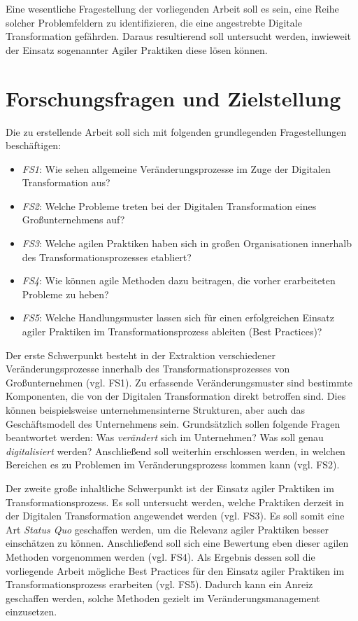 Eine wesentliche Fragestellung der vorliegenden Arbeit soll es sein, eine Reihe solcher Problemfeldern zu identifizieren, die eine angestrebte Digitale Transformation gefährden. Daraus resultierend soll untersucht werden, inwieweit der Einsatz sogenannter Agiler Praktiken diese lösen können.

\section{Forschungsfragen und Zielstellung}

Die zu erstellende Arbeit soll sich mit folgenden grundlegenden
Fragestellungen beschäftigen:

\begin{itemize}[noitemsep, topsep=0pt]
	\item \textit{FS1}: Wie sehen allgemeine Veränderungsprozesse im Zuge der Digitalen Transformation aus?
	\item \textit{FS2}: Welche Probleme treten bei der Digitalen Transformation eines Großunternehmens auf?
	\item \textit{FS3}: Welche agilen Praktiken haben sich in großen Organisationen innerhalb des Transformationsprozesses etabliert?
	\item \textit{FS4}: Wie können agile Methoden dazu beitragen, die vorher erarbeiteten Probleme zu heben?
	\item \textit{FS5}: Welche Handlungsmuster lassen sich für einen erfolgreichen Einsatz agiler Praktiken im Transformationsprozess ableiten (Best Practices)?
\end{itemize}
Der erste Schwerpunkt besteht in der Extraktion verschiedener Veränderungsprozesse innerhalb des Transformationsprozesses von Großunternehmen (vgl. FS1). Zu erfassende Veränderungsmuster sind bestimmte Komponenten, die von der Digitalen Transformation direkt betroffen sind. Dies können beispielsweise unternehmensinterne Strukturen, aber auch das Geschäftsmodell des Unternehmens sein. Grundsätzlich sollen folgende Fragen beantwortet werden: Was \textit{verändert} sich im Unternehmen? Was soll genau \textit{digitalisiert} werden? Anschließend soll weiterhin erschlossen werden,  in welchen Bereichen es zu Problemen im Veränderungsprozess kommen kann (vgl. FS2).

Der zweite große inhaltliche Schwerpunkt ist der Einsatz agiler Praktiken im Transformationsprozess. Es soll untersucht werden, welche Praktiken derzeit in der Digitalen Transformation angewendet werden (vgl. FS3). Es soll somit eine Art \textit{Status Quo} geschaffen werden, um die Relevanz agiler Praktiken besser einschätzen zu können. Anschließend soll sich eine Bewertung eben dieser agilen Methoden vorgenommen werden (vgl. FS4). Als Ergebnis dessen soll die vorliegende Arbeit mögliche Best Practices für den Einsatz agiler Praktiken im Transformationsprozess erarbeiten (vgl. FS5). Dadurch kann ein Anreiz geschaffen werden, solche Methoden gezielt im Veränderungsmanagement einzusetzen. 

